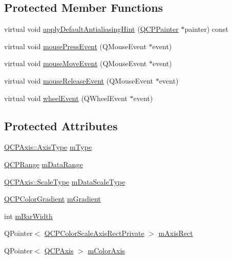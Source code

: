 \subsection*{Protected Member Functions}
\begin{DoxyCompactItemize}
\item 
virtual void \hyperlink{class_q_c_p_color_scale_a23d530c340c15d2fce6583e7120ee8bd}{apply\+Default\+Antialiasing\+Hint} (\hyperlink{class_q_c_p_painter}{Q\+C\+P\+Painter} $\ast$painter) const 
\item 
virtual void \hyperlink{class_q_c_p_color_scale_a5df6ad81b2ad045878d276c2d5be7120}{mouse\+Press\+Event} (Q\+Mouse\+Event $\ast$event)
\item 
virtual void \hyperlink{class_q_c_p_color_scale_a3aca469d531ce7b5882de73590aa0de6}{mouse\+Move\+Event} (Q\+Mouse\+Event $\ast$event)
\item 
virtual void \hyperlink{class_q_c_p_color_scale_a0916613d20901950fc6d00c6f99fe0a1}{mouse\+Release\+Event} (Q\+Mouse\+Event $\ast$event)
\item 
virtual void \hyperlink{class_q_c_p_color_scale_ab398e14c01240f3dc855884fe9e1ee8c}{wheel\+Event} (Q\+Wheel\+Event $\ast$event)
\end{DoxyCompactItemize}
\subsection*{Protected Attributes}
\begin{DoxyCompactItemize}
\item 
\hyperlink{class_q_c_p_axis_ae2bcc1728b382f10f064612b368bc18a}{Q\+C\+P\+Axis\+::\+Axis\+Type} \hyperlink{class_q_c_p_color_scale_a7d47ed4ab76f38e50164e9d77fe33789}{m\+Type}
\item 
\hyperlink{class_q_c_p_range}{Q\+C\+P\+Range} \hyperlink{class_q_c_p_color_scale_a5d4853feb32cd0077bb2b871687c844b}{m\+Data\+Range}
\item 
\hyperlink{class_q_c_p_axis_a36d8e8658dbaa179bf2aeb973db2d6f0}{Q\+C\+P\+Axis\+::\+Scale\+Type} \hyperlink{class_q_c_p_color_scale_a2754d6a78736f64a241e333fbd955372}{m\+Data\+Scale\+Type}
\item 
\hyperlink{class_q_c_p_color_gradient}{Q\+C\+P\+Color\+Gradient} \hyperlink{class_q_c_p_color_scale_ae195a385032066b5c46cc3301af58922}{m\+Gradient}
\item 
int \hyperlink{class_q_c_p_color_scale_a409d2ab78dff1f92da5e6acfb062e811}{m\+Bar\+Width}
\item 
Q\+Pointer$<$ \hyperlink{class_q_c_p_color_scale_axis_rect_private}{Q\+C\+P\+Color\+Scale\+Axis\+Rect\+Private} $>$ \hyperlink{class_q_c_p_color_scale_a6e37f7d49cd614dc50ef1caae60461b9}{m\+Axis\+Rect}
\item 
Q\+Pointer$<$ \hyperlink{class_q_c_p_axis}{Q\+C\+P\+Axis} $>$ \hyperlink{class_q_c_p_color_scale_a2efbc90fd31898fe05d2b74a8422b1d5}{m\+Color\+Axis}
\end{DoxyCompactItemize}

